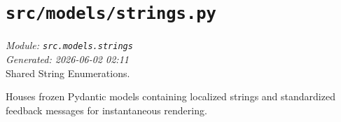
\section{\texttt{src/models/strings.py}}
\textit{Module: \texttt{src.models.strings}} \\
\textit{Generated: 2026-06-02 02:11} \\

Shared String Enumerations.

Houses frozen Pydantic models containing localized strings and
standardized feedback messages for instantaneous rendering.
